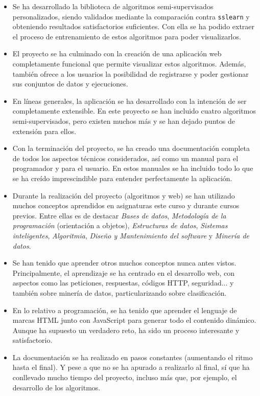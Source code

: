 \begin{itemize}
    \item Se ha desarrollado la biblioteca de algoritmos semi-supervisados
    personalizados, siendo validados mediante la comparación contra
    \texttt{sslearn} y obteniendo resultados satisfactorios suficientes. Con
    ella se ha podido extraer el proceso de entrenamiento de estos algoritmos
    para poder visualizarlos.
    \item El proyecto se ha culminado con la creación de una aplicación web
    completamente funcional que permite visualizar estos algoritmos. Además,
    también ofrece a los usuarios la posibilidad de registrarse y poder
    gestionar sus conjuntos de datos y ejecuciones.
    \item En líneas generales, la aplicación se ha desarrollado con la intención
    de ser completamente extensible. En este proyecto se han incluido cuatro
    algoritmos semi-supervisados, pero existen muchos más y se han dejado puntos
    de extensión para ellos.
    \item Con la terminación del proyecto, se ha creado una documentación
    completa de todos los aspectos técnicos considerados, así como un manual
    para el programador y para el usuario. En estos manuales se ha incluido todo
    lo que se ha creído imprescindible para entender perfectamente la
    aplicación.
    \item Durante la realización del proyecto (algoritmos y web) se han
    utilizado muchos conceptos aprendidos en asignaturas este curso y durante
    cursos previos. Entre ellas es de destacar \emph{Bases de datos},
    \emph{Metodología de la programación} (orientación a objetos),
    \emph{Estructuras de datos}, \emph{Sistemas inteligentes},
    \emph{Algoritmia}, \emph{Diseño y Mantenimiento del software} y
    \emph{Minería de datos}.
    \item Se han tenido que aprender otros muchos conceptos nunca antes vistos.
    Principalmente, el aprendizaje se ha centrado en el desarrollo web, con
    aspectos como las peticiones, respuestas, códigos HTTP, seguridad... y
    también sobre minería de datos, particularizando sobre clasificación.
    \item En lo relativo a programación, se ha tenido que aprender el lenguaje
    de marcas HTML junto con JavaScript para generar todo el contenido dinámico.
    Aunque ha supuesto un verdadero reto, ha sido un proceso interesante y
    satisfactorio.
    \item La documentación se ha realizado en pasos constantes (aumentando el
    ritmo hasta el final). Y pese a que no se ha apurado a realizarlo al final,
    sí que ha conllevado mucho tiempo del proyecto, incluso más que, por
    ejemplo, el desarrollo de los algoritmos.
\end{itemize}

